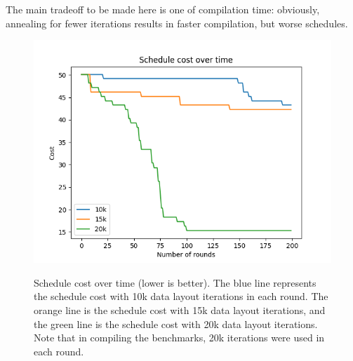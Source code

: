 The main tradeoff to be made here is one of compilation time: obviously, annealing for fewer iterations results in faster compilation, but worse schedules.
\begin{figure}
    \includegraphics[width=0.7\linewidth]{figures/graphs/schedules.png}
    \caption{Schedule cost over time (lower is better). The blue line represents the schedule cost with 10k data layout iterations in each round. The orange line is the schedule cost with 15k data layout iterations, and the green line is the schedule cost with 20k data layout iterations. Note that in compiling the benchmarks, 20k iterations were used in each round.}
    \label{fig:schedule-cost}
\end{figure}




